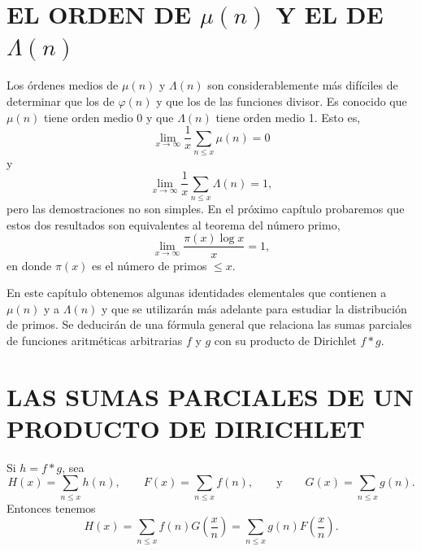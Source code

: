 \documentclass[12pt,a4paper]{book}
\begin{document}
    \section{EL ORDEN DE \texorpdfstring{$\mu(n)$}{μ(n)} Y EL DE \texorpdfstring{$\Lambda(n)$}{Λ(n)}}

    Los órdenes medios de $\mu(n)$ y $\Lambda(n)$ son considerablemente más difíciles de
    determinar que los de $\varphi(n)$ y que los de las funciones divisor. Es conocido que
    $\mu(n)$ tiene orden medio 0 y que $\Lambda(n)$ tiene orden medio 1. Esto es,
    \begin{equation*}
        \lim_{x\to\infty}\frac{1}{x}\sum_{n\leq x}\mu(n)=0
    \end{equation*}
    y
    \begin{equation*}
        \lim_{x\to\infty}\frac{1}{x}\sum_{n\leq x}\Lambda(n)=1,
    \end{equation*}
    pero las demostraciones no son simples. En el próximo capítulo probaremos que estos
    dos resultados son equivalentes al teorema del número primo,
    \begin{equation*}
        \lim_{x\to\infty}\frac{\pi(x)\log x}{x}=1,
    \end{equation*}
    en donde $\pi(x)$ es el número de primos $\leq x$.

    En este capítulo obtenemos algunas identidades elementales que contienen a $\mu(n)$ y
    a $\Lambda(n)$ y que se utilizarán más adelante para estudiar la distribución de
    primos. Se deducirán de una fórmula general que relaciona las sumas parciales de
    funciones aritméticas arbitrarias $f$ y $g$ con su producto de Dirichlet $f*g$.

    \section{LAS SUMAS PARCIALES DE UN PRODUCTO DE DIRICHLET}

    \begin{teorema}
        Si $h=f*g$, sea
        \begin{equation*}
            H(x)=\sum_{n\leq x}h(n),\qquad F(x)=\sum_{n\leq x}f(n),\qquad\text{y}\qquad
            G(x)=\sum_{n\leq x}g(n).
        \end{equation*}
        Entonces tenemos
        \begin{equation}
            H(x)=\sum_{n\leq x}f(n)G\left(\frac{x}{n}\right)=\sum_{n\leq x}g(n)F\left(\frac{x}{n}\right).
        \end{equation}
    \end{teorema}
\end{document}
